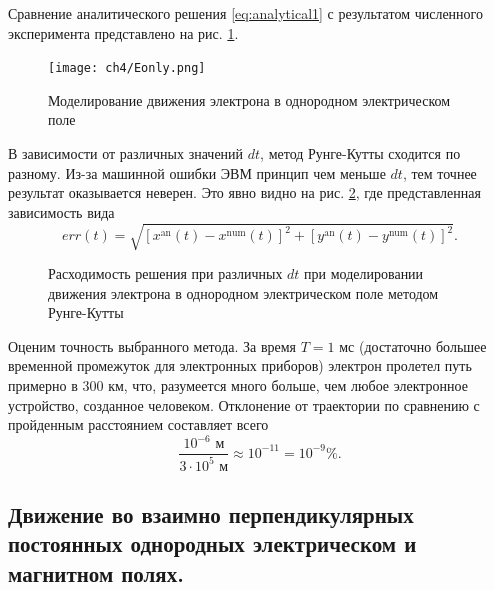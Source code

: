 Сравнение аналитического решения \eqref{eq:analytical1} с результатом численного эксперимента представлено на рис. \ref{fig:Eonly}.

\begin{figure}[h]
\centering
\texttt{[image: ch4/Eonly.png]}
\caption{Моделирование движения электрона в однородном электрическом поле}
\label{fig:Eonly}
\end{figure}

В зависимости от различных значений $dt$, метод Рунге-Кутты сходится по разному. Из-за машинной ошибки ЭВМ принцип чем меньше $dt$, тем точнее результат оказывается неверен. Это явно видно на рис. \ref{fig:errors}, где представленная зависимость вида 
\begin{equation*}
err(t) = \sqrt{ [x^{\text{an}}(t) - x^{\text{num}}(t) ]^2  + [y^{\text{an}}(t) - y^{\text{num}}(t)]^2 }.
\end{equation*}


\begin{figure}[h]
	\begin{minipage}[h]{.33\linewidth}
	\end{minipage}
	\hfill
	\begin{minipage}[h]{.33\linewidth}
	\end{minipage}
	\hfill
	\begin{minipage}[h]{.32\linewidth}
	\end{minipage}
	\caption{Расходимость решения при различных $dt$ при моделировании движения электрона в однородном электрическом поле методом Рунге-Кутты}
	\label{fig:errors}
\end{figure}

Оценим точность выбранного метода. За время $T = 1 \text{ мс}$ (достаточно большее временной промежуток для электронных приборов) электрон пролетел путь примерно в $300 \text{ км}$, что, разумеется много больше, чем любое электронное устройство, созданное человеком. Отклонение от траектории по сравнению с пройденным расстоянием составляет всего $$\dfrac{10^{-6} \text{ м}}{3\cdot10^5 \text{ м}} \approx 10^{-11} = 10^{-9} \%.$$

\subsection{Движение во взаимно перпендикулярных постоянных однородных электрическом и магнитном полях.}

